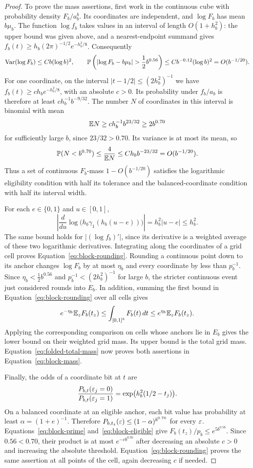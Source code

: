 \begin{proof}
To prove the mass assertions, first work in the continuous cube with
probability density $F_b/a_b^b$.  Its coordinates are independent, and
$\log F_b$ has mean $b\mu_b$.  The function $\log f_b$ takes values in an
interval of length $O(1+h_b^2)$: the upper bound was given above, and a
nearest-endpoint summand gives
$f_b(t)\ge h_b(2\pi)^{-1/2}e^{-h_b^2/8}$.
Consequently
\[
 \operatorname{Var}(\log F_b)\le Cb(\log b)^2,
 \qquad
 \Prob\left(\left|\log F_b-b\mu_b\right|>
                    \frac12b^{0.56}\right)
       \le C b^{-0.12}(\log b)^2=O(b^{-1/20}).
\]
For one coordinate, on the interval
$|t-1/2|\le(2h_b^2)^{-1}$ we have
$f_b(t)\ge c h_b e^{-h_b^2/8}$, with an absolute $c>0$.
Its probability under $f_b/a_b$ is therefore at least
$c h_b^{-1}b^{-9/32}$.  The number $N$ of coordinates in this interval is
binomial with mean
\[
 \mathbb E N\ge c h_b^{-1}b^{23/32}\ge2b^{0.70}
\]
for sufficiently large $b$, since $23/32>0.70$.  Its variance is at most
its mean, so
\[
 \mathbb P(N<b^{0.70})
       \le\frac4{\mathbb E N}
       \le C h_b b^{-23/32}=O(b^{-1/20}).
\]
Thus a set of continuous $F_b$-mass $1-O(b^{-1/20})$ satisfies the
logarithmic eligibility condition with half its tolerance and the
balanced-coordinate condition with half its interval width.

For each $e\in\{0,1\}$ and $u\in[0,1]$,
\[
 \left|\frac{d}{du}\log\bigl(h_b\gamma_1(h_b(u-e))\bigr)\right|
        =h_b^2|u-e|\le h_b^2.
\]
The same bound holds for $|(\log f_b)'|$, since its derivative is a
weighted average of these two logarithmic derivatives.  Integrating
along the coordinates of a grid cell proves
Equation~\eqref{eq:block-rounding}.  Rounding a continuous point down to
its anchor changes $\log F_b$ by at most $\eta_b$ and every coordinate by
less than $p_b^{-1}$.  Since
$\eta_b<\frac12b^{0.56}$ and $p_b^{-1}<(2h_b^2)^{-1}$ for large $b$,
the stricter continuous event just considered rounds into $E_b$.
In addition, summing the first bound in
Equation~\eqref{eq:block-rounding} over all cells gives
\[
 e^{-\eta_b}\mathbb E_zF_b(t_z)
 \le\int_{[0,1]^b}F_b(t)\,dt
 \le e^{\eta_b}\mathbb E_zF_b(t_z).
\]
Applying the corresponding comparison on cells whose anchors lie in
$E_b$ gives the lower bound on their weighted grid mass.  Its upper bound
is the total grid mass.  Equation~\eqref{eq:folded-total-mass} now proves
both assertions in Equation~\eqref{eq:block-mass}.

Finally, the odds of a coordinate bit at $t$ are
\begin{equation}
 \frac{P_{b,t}(\varepsilon_j=0)}{P_{b,t}(\varepsilon_j=1)}
       =\exp\bigl(h_b^2(1/2-t_j)\bigr).
 \label{eq:block-bit-odds}
\end{equation}
On a balanced coordinate at an eligible anchor, each bit value has
probability at least $\alpha=(1+e)^{-1}$.  Therefore
$P_{b,t_z}(\varepsilon)\le(1-\alpha)^{b^{0.70}}$ for every $\varepsilon$.
Equations~\eqref{eq:block-prime} and~\eqref{eq:block-eligible} give
$F_b(t_z)/p_b\le e^{5b^{0.56}}$.  Since $0.56<0.70$, their product is
at most $e^{-c b^{0.70}}$ after decreasing an absolute $c>0$ and increasing
the absolute threshold.  Equation~\eqref{eq:block-rounding} proves the
same assertion at all points of the cell, again decreasing $c$ if needed.
\end{proof}

